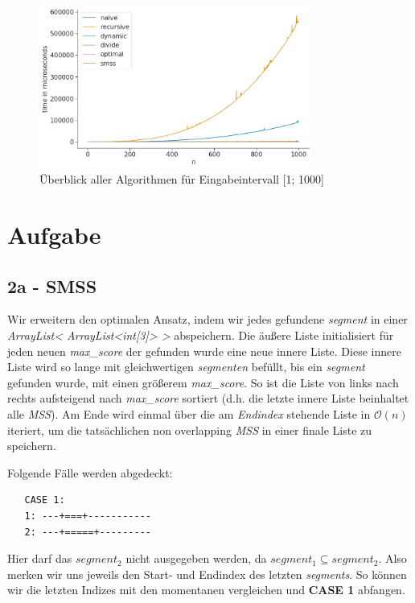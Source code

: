 \documentclass[10pt]{article}
\begin{document}
\begin{figure}[ht]
    \centering
    \includegraphics[width=0.8\textwidth]{../times_1000_all.png}
    \caption{Überblick aller Algorithmen für Eingabeintervall [1; 1000]}
    \label{fig:overview}
\end{figure}

\section{Aufgabe}

\subsection{2a - SMSS}\label{sec:2a}
Wir erweitern den optimalen Ansatz, indem wir jedes gefundene \textit{segment} in einer \textit{ArrayList< ArrayList<int[3]> >} abspeichern.
Die äu\ss ere Liste initialisiert für jeden neuen \textit{max\_score} der gefunden wurde eine neue innere Liste. Diese innere
Liste wird so lange mit gleichwertigen \textit{segmenten} befüllt, bis ein \textit{segment} gefunden wurde, mit einen grö\ss erem
\textit{max\_score}. So ist die Liste von links nach rechts aufsteigend nach \textit{max\_score} sortiert (d.h. die letzte innere Liste beinhaltet alle \textit{MSS}).
Am Ende wird einmal über die am \textit{Endindex} stehende Liste in $\mathcal{O}(n)$ iteriert, um die tatsächlichen non overlapping
\textit{MSS} in einer finale Liste zu speichern.

Folgende Fälle werden abgedeckt: \\
\begin{verbatim} 
   CASE 1:
   1: ---+===+-----------
   2: ---+=====+---------
\end{verbatim}
Hier darf das $segment_{2}$ nicht ausgegeben werden, da $segment_{1} \subseteq segment_2$. Also merken wir uns
jeweils den Start- und Endindex des letzten \textit{segments}. So können wir die letzten Indizes mit den 
momentanen vergleichen und \textbf{CASE 1} abfangen. 
\end{document}
